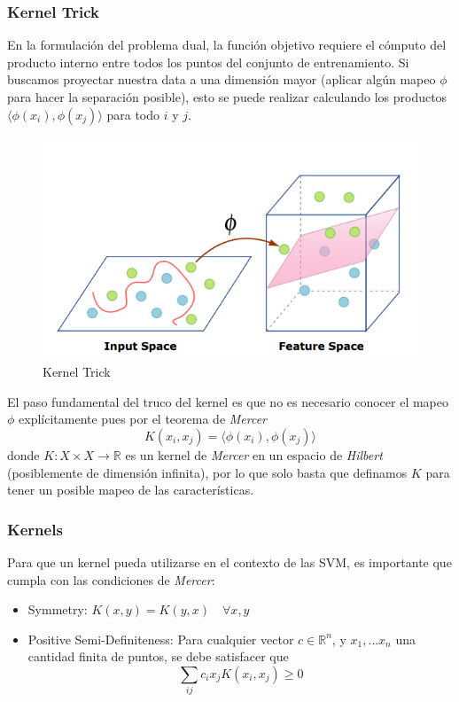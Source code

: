 \subsubsection{Kernel Trick}

En la formulación del problema dual, la función objetivo requiere el cómputo del producto interno entre todos los puntos del conjunto de entrenamiento. Si buscamos proyectar nuestra data a una dimensión mayor (aplicar algún mapeo $\phi$ para hacer la separación posible), esto se puede realizar calculando los productos $ \langle \phi(x_i) , \phi(x_j) \rangle $ para todo $i$ y $j$.

\begin{figure}[H]
    \center
    \includegraphics[scale=0.5]{notebooks/ML/img/kernel_trick.png}
    \caption{Kernel Trick}
\end{figure}

El paso fundamental del truco del kernel es que no es necesario conocer el mapeo $\phi$ explícitamente pues por el teorema de \textit{Mercer}
$$
K(x_i , x_j) = \langle \phi(x_i) , \phi(x_j) \rangle
$$
donde $K: X \times X \rightarrow \mathbb{R} $ es un kernel de \textit{Mercer} en un espacio de \textit{Hilbert} (posiblemente de dimensión infinita), por lo que solo basta que definamos $K$ para tener un posible mapeo de las características. 

\subsubsection{Kernels}

Para que un kernel pueda utilizarse en el contexto de las SVM, es importante que cumpla con las condiciones de \textit{Mercer}: 
\begin{itemize}
    \item Symmetry: $K(x,y) = K(y,x) \quad \forall x,y$ 
    \item Positive Semi-Definiteness: Para cualquier vector $c \in \mathbb{R}^n$, y $x_1 , \dots x_n$ una cantidad finita de puntos, se debe satisfacer que  
    $$\sum_{ij}c_ix_jK(x_i,x_j) \geq 0$$
\end{itemize}

